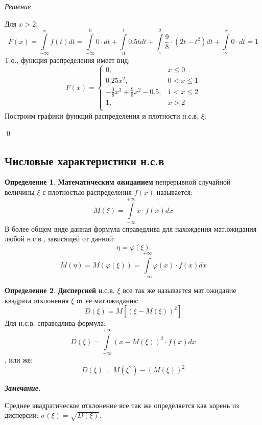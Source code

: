 \documentclass[12pt,a4paper]{article}
\theoremstyle{definition}
\newtheorem{definition}{Определение}[section]
\theoremstyle{definition}
\theoremstyle{remark}
\newenvironment{remark}{
  \par\noindent\textbf{\textit{Замечание.}}~
}{\par}
\theoremstyle{corollary}
\theoremstyle{bolditalic}
\newenvironment{solution}{
    \vspace{0.5em}
    \noindent\textit{Решение.}
}{\qed\vspace{1em}}
\begin{document}
\begin{solution}
\[     \]
     Для $x > 2$:
     \[
      F(x)=\int\limits_{-\infty}^{x}{f(t) dt}=\int\limits_{-\infty}^{0}{0\cdot dt} + \int\limits_{0}^{1}{0.5t dt} + \int\limits_{1}^{2}{\frac{9}{8}\cdot (2t-t^2) dt}+\int\limits_{2}^{x}{0\cdot dt}=1
     \]
     Т.о., функция распределения имеет вид:
     \[
     F(x) = \begin{cases}
      0, & x \le 0 \\
      0.25x^2, & 0 < x \le  1\\
      -\frac{3}{8}x^3+\frac{9}{8}x^2-0.5, & 1 < x \le 2 \\
      1, & x > 2 \\
    \end{cases}
     \]
    Построим графики функций распределения и плотности н.с.в. $\xi$:
    
\end{solution}

\subsection{Числовые характеристики н.с.в}

\begin{definition}
    \textbf{Математическим ожиданием} непрерывной случайной величины $\xi$ с плотностью распределения $f(x)$ называется:
    \[
    M(\xi) = \int\limits_{-\infty}^{+\infty}{x\cdot f(x)dx}
    \]
    В более общем виде данная формула справедлива для нахождения мат.ожидания любой н.с.в., зависящей от данной:
    \[
    \eta = \varphi(\xi)
    \]
    \[
    M(\eta)=M(\varphi(\xi))=\int\limits_{-\infty}^{+\infty}{\varphi(x)\cdot f(x)dx}
    \]
\end{definition}

\begin{definition}
    \textbf{Дисперсией} н.с.в. $\xi$ все так же называется мат.ожидание квадрата отклонения $\xi$ от ее мат.ожидания:
    \[
    D(\xi)=M[(\xi-M(\xi))^2]
    \]
    Для н.с.в. справедлива формула:
    \[
    D(\xi) = \int\limits_{-\infty}^{+\infty}{(x-M(\xi))^2\cdot f(x)dx}
    \]
    , или же:
    \[
    D(\xi)=M(\xi^2)-(M(\xi))^2
    \]
\end{definition}

\begin{remark}
    Среднее квадратическое отклонение все так же определяется как корень из дисперсии: $\sigma(\xi)=\sqrt{D(\xi)}$.
\end{remark}
\end{document}
